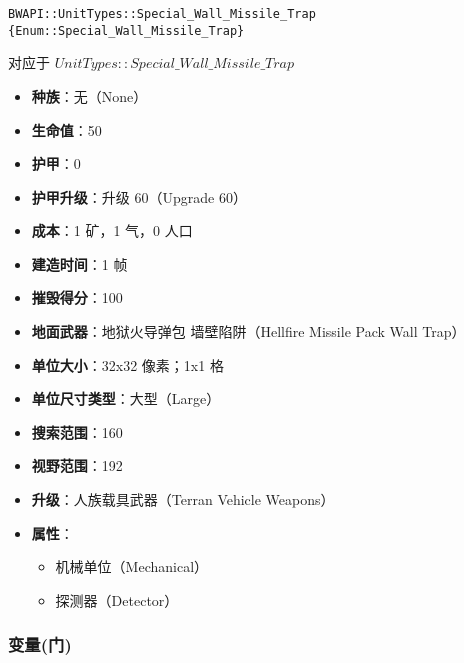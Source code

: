 \begin{tcolorbox}[colback=white, colframe=black!60!white, title=Special\_Wall\_Missile\_Trap(), arc=0mm]
    \begin{verbatim}
BWAPI::UnitTypes::Special_Wall_Missile_Trap {Enum::Special_Wall_Missile_Trap}
    \end{verbatim}
    对应于  $UnitTypes::Special\_Wall\_Missile\_Trap$ 
    \begin{itemize}
        \item \textbf{种族}：无（None）
        \item \textbf{生命值}：50
        \item \textbf{护甲}：0
        \item \textbf{护甲升级}：升级 60（Upgrade 60）
        \item \textbf{成本}：1 矿，1 气，0 人口
        \item \textbf{建造时间}：1 帧
        \item \textbf{摧毁得分}：100
        \item \textbf{地面武器}：地狱火导弹包 墙壁陷阱（Hellfire Missile Pack Wall Trap）
        \item \textbf{单位大小}：32x32 像素；1x1 格
        \item \textbf{单位尺寸类型}：大型（Large）
        \item \textbf{搜索范围}：160
        \item \textbf{视野范围}：192
        \item \textbf{升级}：人族载具武器（Terran Vehicle Weapons）
        \item \textbf{属性}：
            \begin{itemize}
                \item 机械单位（Mechanical）
                \item 探测器（Detector）
            \end{itemize}
    \end{itemize}
\end{tcolorbox}

\subsubsection{变量(门)}

